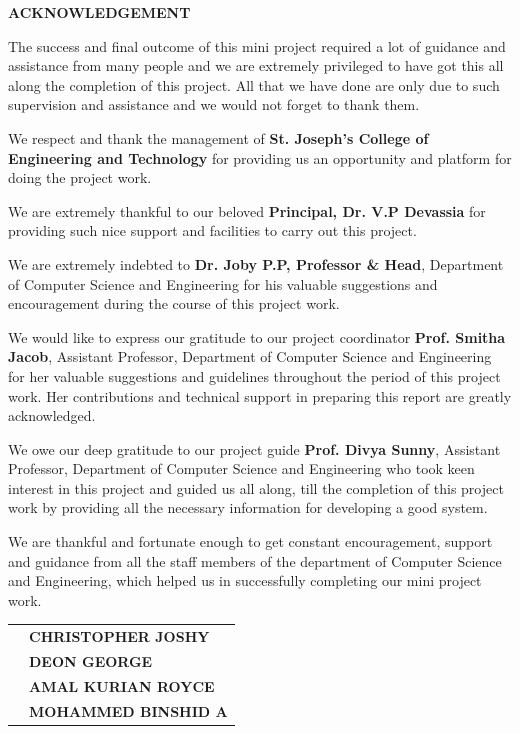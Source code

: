 \begin{titlepage}

\begin{center} 
\begin{LARGE}
\vspace{10cm}
{\textbf{ACKNOWLEDGEMENT}}
\end{LARGE}
\end{center}

The success and final outcome of this mini project required a lot of guidance and assistance from many people and we are extremely privileged to have got this all along the completion of this project. All that we have done are only due to such supervision and assistance and we would not forget to thank them.

We respect and thank the management of \textbf{St. Joseph's College of Engineering and Technology} for providing us an opportunity and platform for doing the project work.

We are extremely thankful to our beloved \textbf{Principal, Dr. V.P Devassia} for providing such nice support and facilities to carry out this project.

We are extremely indebted to \textbf{Dr. Joby P.P, Professor {\&} Head}, Department of Computer Science and Engineering for his valuable suggestions and encouragement during the course of this project work.

We would like to express our gratitude to our project coordinator \textbf{Prof. Smitha Jacob}, Assistant Professor, Department of Computer Science and Engineering for her valuable suggestions and guidelines throughout the period of this project work. Her contributions and technical support in preparing this report are greatly acknowledged.

We owe our deep gratitude to our project guide \textbf{Prof. Divya Sunny}, Assistant Professor, Department of Computer Science and Engineering who took keen interest in this project and guided us all along, till the completion of this project work by providing all the necessary information for developing a good system.

We are thankful and fortunate enough to get constant encouragement, support and guidance from all the staff members of the department of Computer Science and Engineering, which helped us in successfully completing our mini project work.

\vspace{7 pt}
\begin{center}
\begin{tabular}{ll}
{\textbf{} \hspace{250pt}} & {\textbf{CHRISTOPHER JOSHY}}\\
{ \hspace{250pt}} & {\textbf{DEON GEORGE }}\\
 {\hspace{250pt}} &  {\textbf{AMAL KURIAN ROYCE}}\\
 {\hspace{250pt}} &  {\textbf{MOHAMMED BINSHID A}}\\



\end{tabular}
\end{center}
\end{titlepage}
